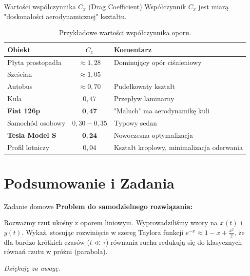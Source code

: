 \documentclass[10pt, aspectratio=43]{beamer}
\begin{document}
\begin{frame}{Wartości współczynnika $C_x$ (Drag Coefficient)}
    Współczynnik $C_x$ jest miarą "doskonałości aerodynamicznej" kształtu.
    
    \begin{table}
        \centering
        \begin{tabular}{l|c|l}
            \textbf{Obiekt} & \textbf{$C_x$} & \textbf{Komentarz} \\
            \hline
            Płyta prostopadła & $\approx 1,28$ & Dominujący opór ciśnieniowy \\
            Sześcian & $\approx 1,05$ & \\
            Autobus & $\approx 0,70$ & Pudełkowaty kształt \\
            Kula & $0,47$ & Przepływ laminarny \\
            \textbf{Fiat 126p} & $\mathbf{0,47}$ & "Maluch" ma aerodynamikę kuli \\
            Samochód osobowy & $0,30 - 0,35$ & Typowy sedan \\
            \textbf{Tesla Model S} & $\mathbf{0,24}$ & Nowoczesna optymalizacja \\
            Profil lotniczy & $0,04$ & Kształt kroplowy, minimalizacja oderwania \\
        \end{tabular}
        \caption{Przykładowe wartości współczynnika oporu.}
    \end{table}
\end{frame}

\section{Podsumowanie i Zadania}

\begin{frame}{Zadanie domowe}
    \textbf{Problem do samodzielnego rozwiązania:}
    
    Rozważmy rzut ukośny z oporem liniowym. Wyprowadziliśmy wzory na $x(t)$ i $y(t)$.
    Wykaż, stosując rozwinięcie w szereg Taylora funkcji $e^{-x} \approx 1 - x + \frac{x^2}{2}$, że dla bardzo krótkich czasów ($t \ll \tau$) równania ruchu redukują się do klasycznych równań rzutu w próżni (parabola).
    
    \vspace{1cm}
    \centering
    \textit{Dziękuję za uwagę.}
\end{frame}
\end{document}
